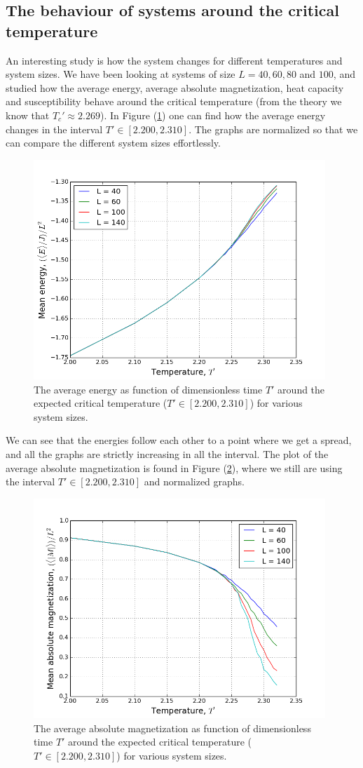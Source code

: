 \documentclass[norsk,a4paper,12pt]{article}
\begin{document}
\subsection{The behaviour of systems around the critical temperature}
An interesting study is how the system changes for different temperatures and system sizes. We have been looking at systems of size $L=40, 60, 80$ and $100$, and studied how the average energy, average absolute magnetization, heat capacity and susceptibility behave around the critical temperature (from the theory we know that $T_c'\approx2.269$). In Figure (\ref{4e_E}) one can find how the average energy changes in the interval $T'\in[2.200,2.310]$. The graphs are normalized so that we can compare the different system sizes effortlessly. 
\begin{figure}[h]
\centering
\includegraphics[width=110mm]{plot_4e_E.png}
\caption{The average energy as function of dimensionless time $T'$ around the expected critical temperature ($T'\in[2.200,2.310]$) for various system sizes. \label{4e_E}}
\end{figure}
We can see that the energies follow each other to a point where we get a spread, and all the graphs are strictly increasing in all the interval. The plot of the average absolute magnetization is found in Figure (\ref{4e_M}), where we still are using the interval $T'\in[2.200,2.310]$ and normalized graphs.
\begin{figure}[H]
\centering
\includegraphics[width=110mm]{plot_4e_M.png}
\caption{The average absolute magnetization as function of dimensionless time $T'$ around the expected critical temperature ($T'\in[2.200,2.310]$) for various system sizes. \label{4e_M}}
\end{figure}
\end{document}
